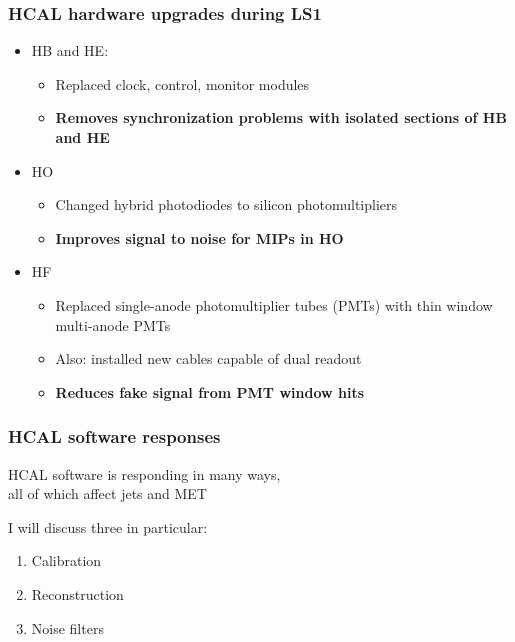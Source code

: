\documentclass[bigger]{beamer}
\providecommand{\alert}[1]{\textbf{#1}}
\begin{document}
\begin{frame}
\frametitle{HCAL hardware upgrades during LS1}
\label{sec-1-1-2}
\begin{itemize}

\item HB and HE:
\label{sec-1-1-2-1}%
\begin{itemize}

\item Replaced clock, control, monitor modules
\label{sec-1-1-2-1-1}%

\item \alert{Removes synchronization problems with isolated sections of HB and HE}
\label{sec-1-1-2-1-2}%
\end{itemize} %

\item HO
\label{sec-1-1-2-2}%
\begin{itemize}

\item Changed hybrid photodiodes to silicon photomultipliers
\label{sec-1-1-2-2-1}%

\item \alert{Improves signal to noise for MIPs in HO}
\label{sec-1-1-2-2-2}%
\end{itemize} %

\item HF
\label{sec-1-1-2-3}%
\begin{itemize}

\item Replaced single-anode photomultiplier tubes (PMTs) with thin window multi-anode PMTs
\label{sec-1-1-2-3-1}%

\item Also: installed new cables capable of dual readout
\label{sec-1-1-2-3-2}%

\item \alert{Reduces fake signal from PMT window hits}
\label{sec-1-1-2-3-3}%
\end{itemize} %
\end{itemize} %
\end{frame}
\begin{frame}
\frametitle{HCAL software responses}
\label{sec-1-1-3}

\centering
HCAL software is responding in many ways, \\
all of which affect jets and MET
\begin{block}{I will discuss three in particular:}
\label{sec-1-1-3-1}

\begin{enumerate}
\item Calibration
\item Reconstruction
\item Noise filters
\end{enumerate}
\end{block}
\end{frame}
\end{document}

